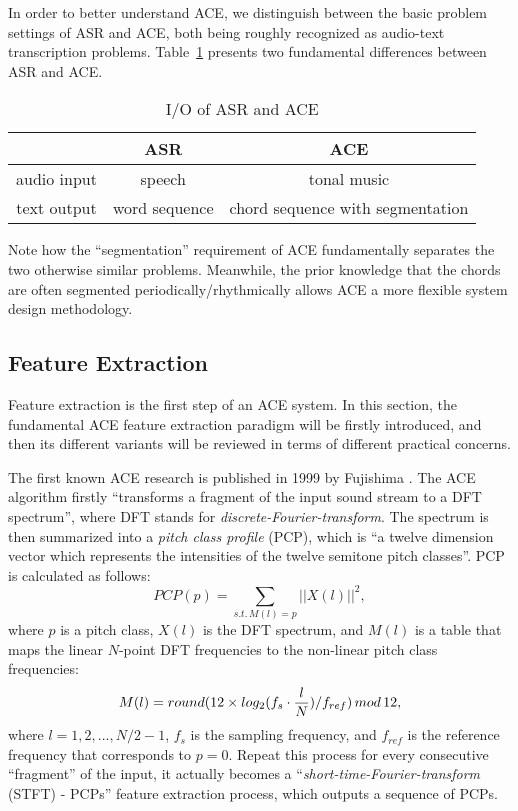 In order to better understand ACE, we distinguish between the basic problem settings of ASR and ACE, both being roughly recognized as audio-text transcription problems. Table~\ref{tab:2-asrace} presents two fundamental differences between ASR and ACE.
\begin{table}[htb]
\caption{I/O of ASR and ACE}
\centering
\footnotesize
\begin{tabular}{|c|c|c|} \hline
	& ASR & ACE \\ \hline
audio input & speech & tonal music \\ \hline
text output & word sequence & chord sequence with segmentation \\ \hline
\end{tabular}
\label{tab:2-asrace}
\end{table}
Note how the ``segmentation'' requirement of ACE fundamentally separates the two otherwise similar problems. Meanwhile, the prior knowledge that the chords are often segmented periodically/rhythmically allows ACE a more flexible system design methodology.


\subsection{Feature Extraction} \label{sec:2-fe}
Feature extraction is the first step of an ACE system. In this section, the fundamental ACE feature extraction paradigm will be firstly introduced, and then its different variants will be reviewed in terms of different practical concerns.

The first known ACE research is published in 1999 by Fujishima \cite{fujishima1999realtime}. The ACE algorithm firstly ``transforms a fragment of the input sound stream to a DFT spectrum'', where DFT stands for {\it discrete-Fourier-transform}. The spectrum is then summarized into a {\it pitch class profile} (PCP), which is ``a twelve dimension vector which represents the intensities of the twelve semitone pitch classes''. PCP is calculated as follows:
\begin{equation}
PCP(p) = \sum_{s.t.\,M(l)=p}{||X(l)||^2},
\end{equation}
where $p$ is a pitch class, $X(l)$ is the DFT spectrum, and $M(l)$ is a table that maps the linear $N$-point DFT frequencies to the non-linear pitch class frequencies:
\begin{equation}
M(l) = round(12 \times log_2({f_s} \cdot {l\over N})/f_{ref})\,mod\,12,
\end{equation}
where $l=1,2,...,N/2-1$, $f_s$ is the sampling frequency, and $f_{ref}$ is the reference frequency that corresponds to $p=0$. Repeat this process for every consecutive ``fragment'' of the input, it actually becomes a ``{\it short-time-Fourier-transform} (STFT) - PCPs'' feature extraction process, which outputs a sequence of PCPs.

